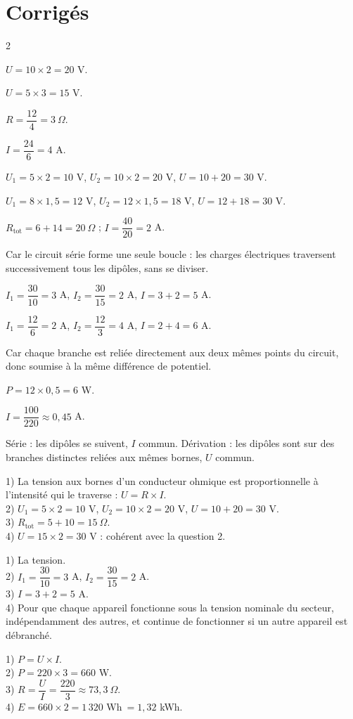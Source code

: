 \section{Corrigés}
\begin{multicols}{2}

$U=10\times2=20$ V.

$U=5\times3=15$ V.

$R=\dfrac{12}4=3\ \Omega$.

$I=\dfrac{24}6=4$ A.

$U_1=5\times2=10$ V, $U_2=10\times2=20$ V, $U=10+20=30$ V.

$U_1=8\times1{,}5=12$ V, $U_2=12\times1{,}5=18$ V, $U=12+18=30$ V.

$R_{\text{tot}}=6+14=20\ \Omega$ ; $I=\dfrac{40}{20}=2$ A.

Car le circuit série forme une seule boucle : les charges électriques traversent
successivement tous les dipôles, sans se diviser.

$I_1=\dfrac{30}{10}=3$ A, $I_2=\dfrac{30}{15}=2$ A, $I=3+2=5$ A.

$I_1=\dfrac{12}6=2$ A, $I_2=\dfrac{12}3=4$ A, $I=2+4=6$ A.

Car chaque branche est reliée directement aux deux mêmes points du circuit, donc soumise à
la même différence de potentiel.

$P=12\times0{,}5=6$ W.

$I=\dfrac{100}{220}\approx0{,}45$ A.

Série : les dipôles se suivent, $I$ commun. Dérivation : les dipôles sont sur des branches
distinctes reliées aux mêmes bornes, $U$ commun.

1) La tension aux bornes d'un conducteur ohmique est proportionnelle à l'intensité qui le
traverse : $U=R\times I$.\\
2) $U_1=5\times2=10$ V, $U_2=10\times2=20$ V, $U=10+20=30$ V.\\
3) $R_{\text{tot}}=5+10=15\ \Omega$.\\
4) $U=15\times2=30$ V : cohérent avec la question 2.

1) La tension.\\
2) $I_1=\dfrac{30}{10}=3$ A, $I_2=\dfrac{30}{15}=2$ A.\\
3) $I=3+2=5$ A.\\
4) Pour que chaque appareil fonctionne sous la tension nominale du secteur, indépendamment
des autres, et continue de fonctionner si un autre appareil est débranché.

1) $P=U\times I$.\\
2) $P=220\times3=660$ W.\\
3) $R=\dfrac UI=\dfrac{220}3\approx73{,}3\ \Omega$.\\
4) $E=660\times2=1\,320$ Wh$\ =1{,}32$ kWh.

\end{multicols}
\exercicesBanner
